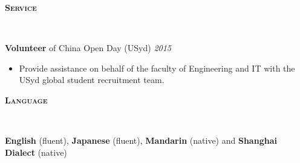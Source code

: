\documentclass[letterpaper, 10pt]{article}
\newenvironment{changemargin}[2]{%
  \begin{list}{}{%
      \setlength{\topsep}{0pt}%
      \setlength{\leftmargin}{#1}%
      \setlength{\rightmargin}{#2}%
      \setlength{\listparindent}{\parindent}%
      \setlength{\itemindent}{\parindent}%
      \setlength{\parsep}{\parskip}%
    }%
  \item[]}{\end{list}
}
\newcommand{\lineover}{
  \begin{changemargin}{-0.05in}{-0.05in}
    \vspace*{-8pt}
    \hrulefill \\
    \vspace*{-2pt}
  \end{changemargin}
}
\newcommand{\header}[1]{
  \begin{changemargin}{-0.5in}{-0.5in}
    \textbf{\scshape{#1}}\\
    \lineover
  \end{changemargin}
}
\newenvironment{body} {
  \vspace*{-16pt}
  \begin{changemargin}{-0.25in}{-0.5in}
  }
  {\end{changemargin}
}
\begin{document}
\header{Service}
\begin{body}
	\vspace{14pt}
	
	\textbf{Volunteer} of China Open Day (USyd) \hfill
	\emph{2015}
	\vspace{-2pt}
	\begin{itemize}
		\setlength{\itemindent}{0in}
		\setlength{\itemsep}{0in}
		\item Provide assistance on behalf of the faculty of Engineering and IT with the USyd global student recruitment team. 
	\end{itemize}
	

\end{body}
\smallskip
 \header{Language}

 \begin{body}
   \vspace{14pt}
   \textbf{English} (fluent), \textbf{Japanese} (fluent), \textbf{Mandarin} (native) and \textbf{Shanghai Dialect} (native) \\
 \end{body}
\end{document}
